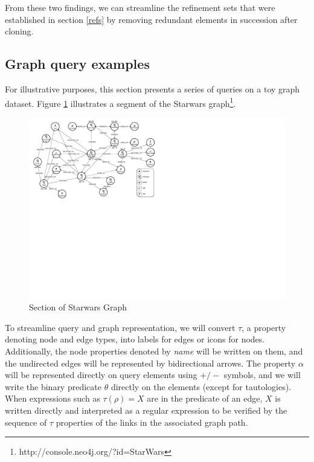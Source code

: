 \documentclass[mathematics,article,submit,pdftex,moreauthors]{Definitions/mdpi}
\begin{document}
From these two findings, we can streamline the refinement sets that were established in section \ref{refs} by removing redundant elements in succession after cloning. 

\subsection{Graph query examples}

For illustrative purposes, this section presents a series of queries on a toy graph dataset. Figure \ref{starwars} illustrates a segment of the Starwars graph\footnote{http://console.neo4j.org/?id=StarWars}.

\begin{figure}[h!]
    \begin{center}
        \includegraphics[width=\columnwidth]{png/FIG5.pdf}
    \end{center}
    \caption{%
        Section of Starwars Graph
    }%
    \label{starwars}
\end{figure}

To streamline query and graph representation, we will convert $\tau$, a property denoting node and edge types, into labels for edges or icons for nodes. Additionally, the node properties denoted by \textit{name} will be written on them, and the undirected edges will be represented by bidirectional arrows. The property $\alpha$ will be represented directly on query elements using $+ / -$ symbols, and we will write the binary predicate $\theta$ directly on the elements (except for tautologies). When expressions such as $\tau (\rho) = X$ are in the predicate of an edge, $X$ is written directly and interpreted as a regular expression to be verified by the sequence of $\tau$ properties of the links in the associated graph path. 
\end{document}
